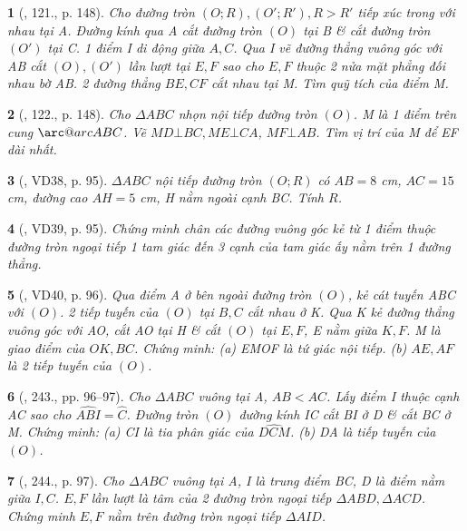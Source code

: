 \documentclass{article}
\makeatletter
\newcommand{\arc@char}{{\usefont{U}{tipa}{m}{n}\symbol{62}}}%
\newcommand{\arc}[1]{\mathpalette\arc@arc{#1}}
\newcommand{\arc@arc}[2]{%
	\sbox0{$\m@th#1#2$}%
	\vbox{
		\hbox{\resizebox{\wd0}{\height}{\arc@char}}
		\nointerlineskip
		\box0
	}%
}
\newtheorem{baitoan}{}
\makeatother
\begin{document}
\begin{baitoan}[\cite{Tuyen_Toan_9_old}, 121., p. 148]
	Cho đường tròn $(O;R),(O';R'),R > R'$ tiếp xúc trong với nhau tại A. Đường kính qua A cắt đường tròn $(O)$ tại B \& cắt đường tròn $(O')$ tại C. 1 điểm I di động giữa $A,C$. Qua I vẽ đường thẳng vuông góc với AB cắt $(O),(O')$ lần lượt tại $E,F$ sao cho $E,F$ thuộc 2 nửa mặt phẳng đối nhau bờ AB. 2 đường thẳng $BE,CF$ cắt nhau tại M. Tìm quỹ tích của điểm M.
\end{baitoan}

\begin{baitoan}[\cite{Tuyen_Toan_9_old}, 122., p. 148]
	Cho $\Delta ABC$ nhọn nội tiếp đường tròn $(O)$. M là 1 điểm trên cung $\arc{ABC}$. Vẽ $MD\bot BC,ME\bot CA$, $MF\bot AB$. Tìm vị trí của M để EF dài nhất. 
\end{baitoan}

\begin{baitoan}[\cite{Binh_Toan_9_tap_2}, VD38, p. 95]
	$\Delta ABC$ nội tiếp đường tròn $(O;R)$ có $AB = 8$ {\rm cm}, $AC = 15$ {\rm cm}, đường cao $AH = 5$ {\rm cm}, H nằm ngoài cạnh BC. Tính $R$.
\end{baitoan}

\begin{baitoan}[\cite{Binh_Toan_9_tap_2}, VD39, p. 95]
	Chứng minh chân các đường vuông góc kẻ từ 1 điểm thuộc đường tròn ngoại tiếp 1 tam giác đến 3 cạnh của tam giác ấy nằm trên 1 đường thẳng.
\end{baitoan}

\begin{baitoan}[\cite{Binh_Toan_9_tap_2}, VD40, p. 96]
	Qua điểm A ở bên ngoài đường tròn $(O)$, kẻ cát tuyến ABC với $(O)$. 2 tiếp tuyến của $(O)$ tại $B,C$ cắt nhau ở K. Qua K kẻ đường thẳng vuông góc với AO, cắt AO tại H \& cắt $(O)$ tại $E,F$, E nằm giữa $K,F$. M là giao điểm của $OK,BC$. Chứng minh: (a) EMOF là tứ giác nội tiếp. (b) $AE,AF$ là 2 tiếp tuyến của $(O)$.
\end{baitoan}

\begin{baitoan}[\cite{Binh_Toan_9_tap_2}, 243., pp. 96--97]
	Cho $\Delta ABC$ vuông tại A, $AB < AC$. Lấy điểm I thuộc cạnh AC sao cho $\widehat{ABI} = \widehat{C}$. Đường tròn $(O)$ đường kính IC cắt BI ở D \& cắt BC ở M. Chứng minh: (a) CI là tia phân giác của $\widehat{DCM}$. (b) DA là tiếp tuyến của $(O)$.
\end{baitoan}

\begin{baitoan}[\cite{Binh_Toan_9_tap_2}, 244., p. 97]
	Cho $\Delta ABC$ vuông tại A, I là trung điểm BC, D là điểm nằm giữa $I,C$. $E,F$ lần lượt là tâm của 2 đường tròn ngoại tiếp $\Delta ABD,\Delta ACD$. Chứng minh $E,F$ nằm trên đường tròn ngoại tiếp $\Delta AID$.
\end{baitoan}
\end{document}

